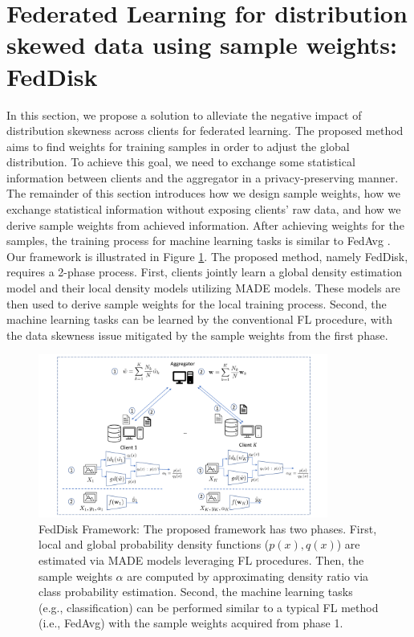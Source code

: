 \documentclass[mathfont=newtx]{uai2023} %
\newcommand{\MethodnameLong}{Federated Learning for distribution skewed data using sample weights: FedDisk}
\newcommand{\MethodnameShort}{FedDisk}
\begin{document}
\section{\MethodnameLong{}}
\label{sec:methodology}
In this section, we propose a solution to alleviate the negative impact of distribution skewness across clients for federated learning. The proposed method aims to find weights for training samples in order to adjust the global distribution. To achieve this goal, we need to exchange some statistical information between clients and the aggregator in a privacy-preserving manner. The remainder of this section introduces how we design sample weights, how we exchange statistical information without exposing clients' raw data, and how we derive sample weights from achieved information. After achieving weights for the samples, the training process for machine learning tasks is similar to FedAvg \cite{OriginFL}. Our framework is illustrated in Figure \ref{fig:framework}. The proposed method, namely \MethodnameShort{}, requires a 2-phase process. First, clients jointly learn a global density estimation model and their local density models utilizing MADE models. These models are then used to derive sample weights for the local training process. Second, the machine learning tasks can be learned by the conventional FL procedure, with the data skewness issue mitigated by the sample weights from the first phase.
\begin{figure}[ht!]
		\centering
		\includegraphics[width=0.85\textwidth, trim={1cm 0.1cm 1cm 0.3cm},clip]{Figures/FL}
		\caption{ \MethodnameShort{} Framework: The proposed framework has two phases. First, local and global probability density functions ($p(x),q(x)$) are estimated via MADE models leveraging FL procedures. Then, the sample weights $\alpha$ are computed by approximating density ratio via class probability estimation. Second, the machine learning tasks (e.g., classification) can be performed similar to a typical FL method (i.e., FedAvg) with the sample weights acquired from phase 1.} 
		\label{fig:framework} 

\end{figure}  
\end{document}
